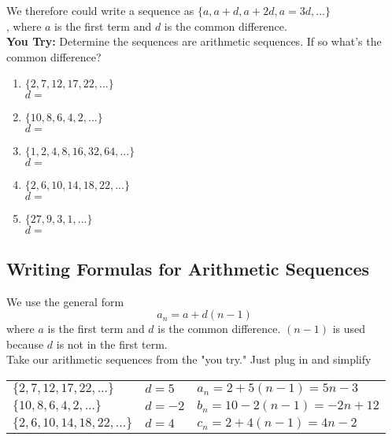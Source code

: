 \documentclass[12pt]{article}
\begin{document}
We therefore could write a sequence as $\{a, a+d, a+2d, a=3d,...\}$\\, where $a$ is the first term and $d$ is the common difference. \\

\textbf{You Try:} Determine the sequences are arithmetic sequences. If so what's the common difference?\\

\begin{enumerate}
\item $\{2,7,12,17,22,...\}$\\
$d=$\\

\item $\{10,8,6,4,2,...\}$\\
$d=$\\

\item $\{1,2,4,8,16,32,64,...\}$\\
$d=$\\

\item $\{2,6,10,14,18,22,...\}$\\
$d=$\\

\item $\{27,9,3,1,...\}$\\
$d=$\\	
\end{enumerate}

\subsection{Writing Formulas for Arithmetic Sequences}

We use the general form $$a_n=a+d(n-1)$$ where $a$ is the first term and $d$ is the common difference. $(n-1)$ is used because $d$ is not in the first term.\\ 

Take our arithmetic sequences from the "you try." Just plug in and simplify\\

\bgroup
\def\arraystretch{2}%
\begin{tabular}{l l l}
 $\{2,7,12,17,22,...\}$ & $d=5$ & $a_n=2+5(n-1)=5n-3$\\

 $\{10,8,6,4,2,...\}$ & $d=-2$ & $b_n=10-2(n-1)=-2n+12$\\

 $\{2,6,10,14,18,22,...\}$ & $d=4$ & $c_n=2+4(n-1)=4n-2$\\
\end{tabular}
\egroup
\end{document}
